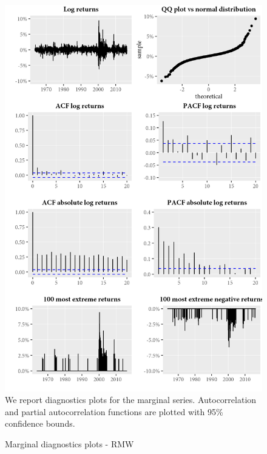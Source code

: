\begin{figure}[H]
  \caption{Marginal diagnostics plots - RMW}
  \label{diag:marginaldiagRMW}
  \toprule
  \centering
  \begin{minipage}{\textwidth}
  \includegraphics[scale=1]{graphics/marginal/MarginalStats.RMW.Estim.png}  
  \bottomrule
  \vspace{3mm}
  \footnotesize
  We report diagnostics plots for the marginal series. Autocorrelation and partial autocorrelation functions are plotted with 95\% confidence bounds. 
  \end{minipage}
\end{figure}
